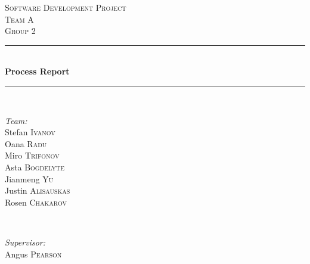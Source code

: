 \documentclass[12pt,oneside]{article}
\begin{document}
	\begin{titlepage}
		
		\newcommand{\HRule}{\rule{\linewidth}{0.5mm}} %
		
		\center %
		
		
		\textsc{\LARGE Software Development Project}\\[1.5cm]
		\textsc{\Large Team A}\\[0.5cm] %
		\textsc{\Large Group 2}\\[0.5cm] %
		
		\HRule \\[0.4cm]
		{ \huge \bfseries Process Report}\\[0.4cm] %
		\HRule \\[1.5cm]
		
		
		\begin{minipage}[t]{0.4\textwidth}
			\begin{flushleft} \large
				\emph{Team:} \\
				Stefan \textsc{Ivanov}\\
				Oana \textsc{Radu}\\
				Miro \textsc{Trifonov}\\
				Asta \textsc{Bogdelyte}\\
				Jianmeng \textsc{Yu}\\
				Justin \textsc{Alisauskas}\\
				Rosen \textsc{Chakarov}\\
			\end{flushleft}
		\end{minipage}
		~
		\begin{minipage}[t]{0.4\textwidth}
			\begin{flushright} \large
				\emph{Supervisor:} \\
				Angus \textsc{Pearson}
			\end{flushright}
		\end{minipage}\\[2cm]
		

\end{titlepage}
\end{document}
